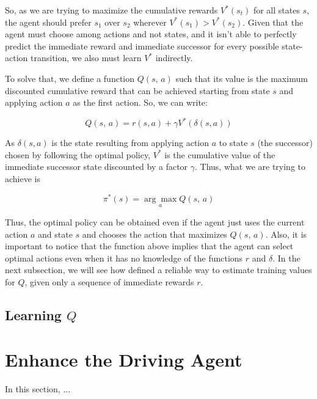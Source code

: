 \documentclass[a4paper]{article}
\begin{document}
So, as we are trying to maximize the cumulative rewards $V^{*}(s_t)$ for all states $s$, the agent should prefer $s_1$ over $s_2$ wherever $V^{*}(s_1) > V^{*}(s_2)$. Given that the agent must choose among actions and not states, and it isn't able to perfectly predict the immediate reward and immediate successor for every possible state-action transition, we also must learn $V^{*}$ indirectly.

To solve that, we define a function $Q(s, \, a)$ such that its value is the maximum discounted cumulative reward that can be achieved starting from state $s$ and applying action $a$ as the first action. So, we can write:

$$Q(s, \, a) = r(s, a) + \gamma V^{*}(\delta(s, a))$$

As $\delta(s, a)$ is the state resulting from applying action $a$ to state $s$ (the successor) chosen by following the optimal policy, $V^{*}$ is the cumulative value of the immediate successor state discounted by a factor $\gamma$. Thus,  what we are trying to achieve is

$$\pi^{*}(s) = \underset{a}{\arg \max} Q(s, \, a)$$

Thus, the optimal policy can be obtained even if the agent just uses the current action $a$ and state $s$ and chooses the action that maximizes $Q(s,\, a)$. Also, it is important to notice that the function above implies that the agent can select optimal actions even when it has no knowledge of the functions $r$ and $\delta$. In the next subsection, we will see how \cite{Mitchell} defined a reliable way to estimate training values for $Q$, given only a sequence of immediate rewards $r$.


\subsection{Learning $Q$}


\section{Enhance the Driving Agent}
\label{sec:enhance_driving_agent}
In this section, ...


\end{document}
